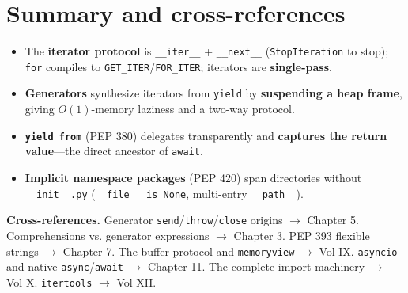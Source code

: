 \section{Summary and cross-references}

\begin{itemize}
  \item The \textbf{iterator protocol} is \texttt{\_\_iter\_\_} + \texttt{\_\_next\_\_}
    (\texttt{StopIteration} to stop); \texttt{for} compiles to \texttt{GET\_ITER}/\texttt{FOR\_ITER};
    iterators are \textbf{single-pass}.
  \item \textbf{Generators} synthesize iterators from \texttt{yield} by \textbf{suspending a heap
    frame}, giving $O(1)$-memory laziness and a two-way protocol.
  \item \textbf{\texttt{yield from}} (PEP 380) delegates transparently and \textbf{captures the
    return value}---the direct ancestor of \texttt{await}.
  \item \textbf{Implicit namespace packages} (PEP 420) span directories without
    \texttt{\_\_init\_\_.py} (\texttt{\_\_file\_\_ is None}, multi-entry \texttt{\_\_path\_\_}).
\end{itemize}

\textbf{Cross-references.} Generator \texttt{send}/\texttt{throw}/\texttt{close} origins
$\rightarrow$ Chapter 5. Comprehensions vs. generator expressions $\rightarrow$ Chapter 3. PEP 393
flexible strings $\rightarrow$ Chapter 7. The buffer protocol and \texttt{memoryview} $\rightarrow$
Vol IX. \texttt{asyncio} and native \texttt{async}/\texttt{await} $\rightarrow$ Chapter 11. The
complete import machinery $\rightarrow$ Vol X. \texttt{itertools} $\rightarrow$ Vol XII.
